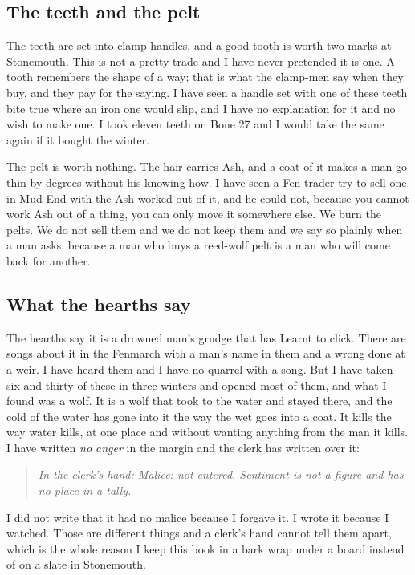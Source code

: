 \documentclass{design/chronicle}
\begin{document}
\subsection*{The teeth and the pelt}

The teeth are set into clamp-handles, and a good tooth is worth two marks at Stonemouth. This is not a pretty trade and I have never pretended it is one. A tooth remembers the shape of a way; that is what the clamp-men say when they buy, and they pay for the saying. I have seen a handle set with one of these teeth bite true where an iron one would slip, and I have no explanation for it and no wish to make one. I took eleven teeth on Bone 27 and I would take the same again if it bought the winter.

The pelt is worth nothing. The hair carries Ash, and a coat of it makes a man go thin by degrees without his knowing how. I have seen a Fen trader try to sell one in Mud End with the Ash worked out of it, and he could not, because you cannot work Ash out of a thing, you can only move it somewhere else. We burn the pelts. We do not sell them and we do not keep them and we say so plainly when a man asks, because a man who buys a reed-wolf pelt is a man who will come back for another.

\subsection*{What the hearths say}

The hearths say it is a drowned man’s grudge that has Learnt to click. There are songs about it in the Fenmarch with a man’s name in them and a wrong done at a weir. I have heard them and I have no quarrel with a song. But I have taken six-and-thirty of these in three winters and opened most of them, and what I found was a wolf. It is a wolf that took to the water and stayed there, and the cold of the water has gone into it the way the wet goes into a coat. It kills the way water kills, at one place and without wanting anything from the man it kills. I have written \emph{no anger} in the margin and the clerk has written over it:

\begin{quote}\itshape \emph{In the clerk’s hand:} Malice: not entered. Sentiment is not a figure and has no place in a tally.\end{quote}

I did not write that it had no malice because I forgave it. I wrote it because I watched. Those are different things and a clerk’s hand cannot tell them apart, which is the whole reason I keep this book in a bark wrap under a board instead of on a slate in Stonemouth.
\end{document}
